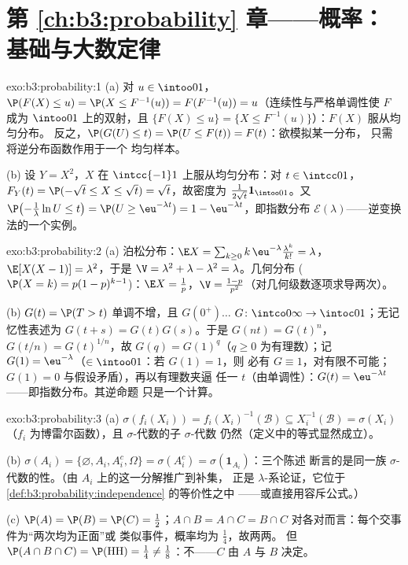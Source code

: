 \section*{第 \ref{ch:b3:probability} 章——概率：
基础与大数定律}

\begin{solution}{exo:b3:probability:1}
(a) 对 $u \in \intoo01$，$\P(F(X) \leq u) = \P(X \leq
F^{-1}(u)) = F(F^{-1}(u)) = u$（连续性与严格单调性使 $F$
成为 $\intoo01$ 上的双射，且
$\{F(X) \leq u\} = \{X \leq F^{-1}(u)\}$）：$F(X)$ 服从均匀分布。
反之，$\P(G(U) \leq t) = \P(U \leq F(t)) = F(t)$：欲模拟某一分布，
只需将逆分布函数作用于一个
均匀样本。

(b) 设 $Y = X^2$，$X$ 在 $\intcc{-1}1$ 上服从均匀分布：对 $t \in
\intcc01$，$F_Y(t) = \P(-\sqrt t \leq X \leq \sqrt t) = \sqrt
t$，故密度为 $\frac1{2\sqrt t}\mathbf 1_{\intoo01}$。又
$\P\bigl(-\frac1\lambda\ln U \leq t\bigr) = \P(U \geq
\eu^{-\lambda t}) = 1 - \eu^{-\lambda t}$，即指数分布
$\mathcal E(\lambda)$——逆变换法的一个实例。
\end{solution}

\begin{solution}{exo:b3:probability:2}
(a) 泊松分布：$\E X = \sum_{k\geq0}k\,\eu^{-\lambda}
\frac{\lambda^k}{k!} = \lambda$，$\E[X(X-1)] = \lambda^2$，于是
$\V = \lambda^2 + \lambda - \lambda^2 = \lambda$。几何分布
($\P(X = k) = p(1-p)^{k-1}$)：$\E X = \frac1p$，$\V =
\frac{1-p}{p^2}$（对几何级数逐项求导两次）。

(b) $G(t) = \P(T > t)$ 单调不增，且 $G(0^+)\dots$
$G \colon \intco0\infty \to \intoc01$；无记忆性表述为
$G(t + s) = G(t)G(s)$。于是 $G(n t) = G(t)^n$，$G(t/n) =
G(t)^{1/n}$，故 $G(q) = G(1)^q$（$q \geq 0$ 为有理数）；记
$G(1) = \eu^{-\lambda}$（$\in \intoo01$：若 $G(1) = 1$，则
必有 $G \equiv 1$，对有限不可能；
$G(1) = 0$ 与假设矛盾），再以有理数夹逼
任一 $t$（由单调性）：$G(t) =
\eu^{-\lambda t}$——即指数分布。其逆命题
只是一个计算。
\end{solution}

\begin{solution}{exo:b3:probability:3}
(a) $\sigma(f_i(X_i)) = f_i(X_i)^{-1}(\mathcal B) \subseteq
X_i^{-1}(\mathcal B) = \sigma(X_i)$（$f_i$ 为博雷尔函数），且
 $\sigma$-代数的子 $\sigma$-代数
仍然（定义中的等式显然成立）。

(b) $\sigma(A_i) = \{\varnothing, A_i, A_i^c, \Omega\} =
\sigma(A_i^c) = \sigma(\mathbf 1_{A_i})$：三个陈述
断言的是同一族
$\sigma$-代数的性。（由 $A_i$ 上的这一分解推广到补集，
正是 $\lambda$-系论证，它位于
\cref{def:b3:probability:independence} 的等价性之中
——或直接用容斥公式。）

(c) $\P(A) = \P(B) = \P(C) = \frac12$；$A\cap B = A\cap C =
B\cap C$ 对各对而言：每个交事件为“两次均为正面”或
类似事件，概率均为 $\frac14$，故两两。
但 $\P(A\cap B\cap C) = \P(\text{HH}) = \frac14 \neq
\frac18$：不——$C$ 由 $A$ 与
$B$ 决定。
\end{solution}

